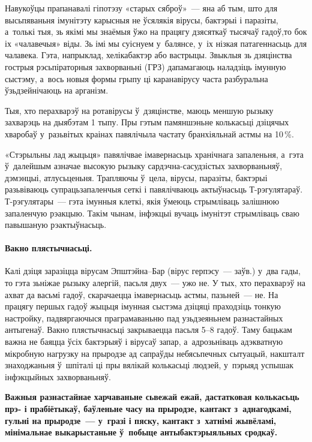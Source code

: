 Навукоўцы прапанавалі гіпотэзу «старых сяброў»~--- яна аб тым, што для высьпяваньня імунітэту карысныя не ўсялякія вірусы, бактэрыі і паразіты, а~толькі тыя, зь якімі мы знаёмыя ўжо на працягу дзясяткаў тысячаў гадоў,то бок іх «чалавечыя» віды. Зь імі мы суіснуем у~балянсе, у~іх нізкая патагеннасьць для чалавека. Гэта, напрыклад, хелікабактэр або вастрыцы. Звыклыя зь дзяцінства гострыя рэсьпіраторныя захворваньні (ГРЗ) дапамагаюць наладзіць імунную сыстэму, а~вось новыя формы грыпу ці каранавірусу часта разбуральна ўзьдзейнічаюць на арганізм. 

Тыя, хто перахварэў на ротавірусы ў~дзяцінстве, маюць меншую рызыку захварэць на дыябэтам 1 тыпу. Пры гэтым памяншэньне колькасьці дзіцячых хваробаў у~разьвітых краінах павялічыла частату бранхіяльнай астмы на 10\,\%.

«Стэрыльны лад жыцьця» павялічвае імавернасьць хранічнага запаленьня, а~гэта ў~далейшым азначае высокую рызыку сардэчна-сасудзістых захворваньняў, дэмэнцыі, атлусьценьня. Трапляючы ў~цела, вірусы, паразіты, бактэрыі разьвіваюць супрацьзапаленчыя сеткі і павялічваюць актыўнасьць Т-рэгулятараў. Т-рэгулятары~--- гэта імунныя клеткі, якія ўмеюць стрымліваць залішнюю запаленчую рэакцыю. Такім чынам, інфэкцыі вучаць імунітэт стрымліваць сваю павышаную рэактыўнасьць.

\paragraph{Вакно плястычнасьці.} Калі дзіця заразіцца вірусам Эп\-штэй\-на--Бар (вірус герпэсу~--- заўв.) у~два гады, то гэта зьніжае рызыку алергій, пасьля двух~--- ужо не. У тых, хто перахварэў на ахват да васьмі гадоў, скарачаецца імавернасьць астмы, пазьней~--- не. На працягу першых гадоў жыцьця імунная сыстэма дзіцяці праходзіць тонкую настройку, падвяргаючыся праграмаваньню пад узьдзеяньнем разнастайных антыгенаў. Вакно плястычнасьці закрываецца пасьля 5--8 гадоў. Таму бацькам важна не баяцца ўсіх бактэрыяў і вірусаў запар, а~адрозьніваць адэкватную мікробную нагрузку на прыродзе ад сапраўды небясьпечных сытуацый, накшталт знаходжаньня ў~шпіталі ці пры вялікай колькасьці людзей, у~пэрыяд успышак інфэкцыйных захворваньняў.

\textbf{Важныя разнастайнае харчаваньне сьвежай ежай, дастатковая колькасьць прэ- і прабіётыкаў, баўленьне часу на прыродзе, кантакт з~аднагодкамі, гульні на прыродзе~--- у~гразі і пяску, кантакт з~хатнімі жывёламі, мінімальнае выкарыстаньне ў~побыце антыбактэрыяльных сродкаў.}


